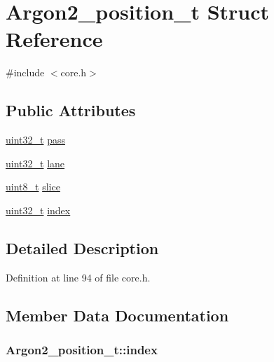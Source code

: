 \hypertarget{struct_argon2__position__t}{}\section{Argon2\+\_\+position\+\_\+t Struct Reference}
\label{struct_argon2__position__t}


{\ttfamily \#include $<$core.\+h$>$}

\subsection*{Public Attributes}
\begin{DoxyCompactItemize}
\item 
\hyperlink{stdint_8h_a435d1572bf3f880d55459d9805097f62}{uint32\+\_\+t} \hyperlink{struct_argon2__position__t_aa216fa94d8094fe78f18b3979ddfb471}{pass}
\item 
\hyperlink{stdint_8h_a435d1572bf3f880d55459d9805097f62}{uint32\+\_\+t} \hyperlink{struct_argon2__position__t_ac17e6249186213e0ddbaa1b469df7283}{lane}
\item 
\hyperlink{stdint_8h_aba7bc1797add20fe3efdf37ced1182c5}{uint8\+\_\+t} \hyperlink{struct_argon2__position__t_a3fba685c73afabb933fb48088fc3c063}{slice}
\item 
\hyperlink{stdint_8h_a435d1572bf3f880d55459d9805097f62}{uint32\+\_\+t} \hyperlink{struct_argon2__position__t_afb869bff35a0933daf00575b47dad939}{index}
\end{DoxyCompactItemize}


\subsection{Detailed Description}


Definition at line 94 of file core.\+h.



\subsection{Member Data Documentation}
\hypertarget{struct_argon2__position__t_afb869bff35a0933daf00575b47dad939}{}
\subsubsection[{index}]{ Argon2\+\_\+position\+\_\+t\+::index}\label{struct_argon2__position__t_afb869bff35a0933daf00575b47dad939}


